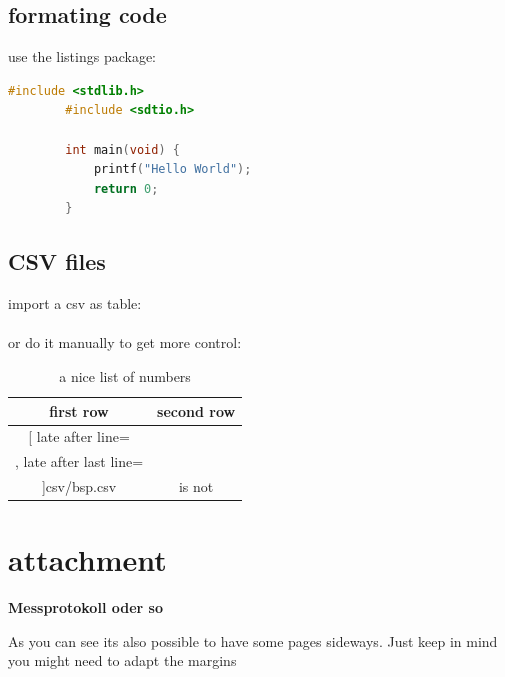 \documentclass[	%
		fontsize=11pt,  %
		a4paper,	    %
		twoside,		%
		english,		%
		sans,			%
		f1				%
	]{HsH-report}		%
\begin{document}
\section{formating code}
	\label{sec: code}
	use the listings package:
	\begin{lstlisting}[language=c,gobble=8]
		#include <stdlib.h>
		#include <sdtio.h>

		int main(void) {
			printf("Hello World");
			return 0;
		}
	\end{lstlisting}

\section{CSV files}
	\label{sec: messwerte}
	import a csv as table:\\
	\\
	or do it manually to get more control:
	\begin{table}
		\caption{a nice list of numbers}
		\begin{tabular}{c|c}
			first row & second row \\\hline\hline
			\csvreader[
				late after line=\\\hline,
				late after last line=\\\hline
			]{csv/bsp.csv}{}{number: $\csvcoli\,\metre$ & is not \csvcoliii}
		\end{tabular}
	\end{table}



\clearpage
{} %
\recalctypearea
\chapter{attachment}
\textbf{\Large{Messprotokoll oder so}} %

As you can see its also possible to have some pages sideways. Just keep in mind you might need to adapt the margins

\newpage
{} %
\recalctypearea

\printbibliography
\noindent\begin{minipage}{\textwidth} %
	\listoffigures
	\listoftables
\end{minipage}
\end{document}
